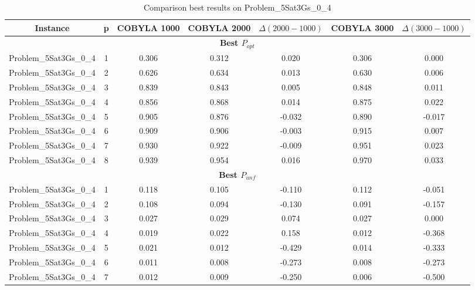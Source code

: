 \begin{table}[!htbp]
    \renewcommand{\arraystretch}{0.7}
    \scriptsize
    \centering
    \caption{Comparison best results on Problem\_5Sat3Gs\_0\_4}
    \begin{adjustbox}{max width=\columnwidth}
        \begin{tabularx}{\columnwidth}{c|c c c c c c}
            \toprule
            \textbf{Instance} & \textbf{p} & \textbf{COBYLA 1000} & \textbf{COBYLA 2000} & $\Delta(2000-1000)$ & \textbf{COBYLA 3000} & $\Delta(3000-1000)$ \\
            \midrule
            \multicolumn{7}{c}{\textbf{Best $P_{opt}$}} \\ \midrule
            Problem\_5Sat3Gs\_0\_4 & 1 & 0.306 & 0.312 & 0.020 & 0.306 & 0.000 \\
            Problem\_5Sat3Gs\_0\_4 & 2 & 0.626 & 0.634 & 0.013 & 0.630 & 0.006 \\
            Problem\_5Sat3Gs\_0\_4 & 3 & 0.839 & 0.843 & 0.005 & 0.848 & 0.011 \\
            Problem\_5Sat3Gs\_0\_4 & 4 & 0.856 & 0.868 & 0.014 & 0.875 & 0.022 \\
            Problem\_5Sat3Gs\_0\_4 & 5 & 0.905 & 0.876 & -0.032 & 0.890 & -0.017 \\
            Problem\_5Sat3Gs\_0\_4 & 6 & 0.909 & 0.906 & -0.003 & 0.915 & 0.007 \\
            Problem\_5Sat3Gs\_0\_4 & 7 & 0.930 & 0.922 & -0.009 & 0.951 & 0.023 \\
            Problem\_5Sat3Gs\_0\_4 & 8 & 0.939 & 0.954 & 0.016 & 0.970 & 0.033 \\
            \multicolumn{7}{c}{\textbf{Best $P_{unf}$}} \\ \midrule
            Problem\_5Sat3Gs\_0\_4 & 1 & 0.118 & 0.105 & -0.110 & 0.112 & -0.051 \\
            Problem\_5Sat3Gs\_0\_4 & 2 & 0.108 & 0.094 & -0.130 & 0.091 & -0.157 \\
            Problem\_5Sat3Gs\_0\_4 & 3 & 0.027 & 0.029 & 0.074 & 0.027 & 0.000 \\
            Problem\_5Sat3Gs\_0\_4 & 4 & 0.019 & 0.022 & 0.158 & 0.012 & -0.368 \\
            Problem\_5Sat3Gs\_0\_4 & 5 & 0.021 & 0.012 & -0.429 & 0.014 & -0.333 \\
            Problem\_5Sat3Gs\_0\_4 & 6 & 0.011 & 0.008 & -0.273 & 0.008 & -0.273 \\
            Problem\_5Sat3Gs\_0\_4 & 7 & 0.012 & 0.009 & -0.250 & 0.006 & -0.500 \\

\end{tabularx}
\end{adjustbox}
\end{table}
